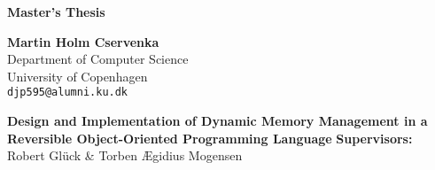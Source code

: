 \begin{titlepage}

\begin{flushleft}
\vspace*{3cm}
\textbf{\huge{Master's Thesis}}

\vspace*{3mm}
\textbf{Martin Holm Cservenka} \\
Department of Computer Science \\
University of Copenhagen \\
\texttt{djp595@alumni.ku.dk} 


\vspace*{4cm}
\textbf{\huge{Design and Implementation of Dynamic Memory Management in a Reversible Object-Oriented Programming Language}}
\vfill
\textbf{Supervisors:} Robert Glück \& Torben Ægidius Mogensen

\end{flushleft}
\end{titlepage}